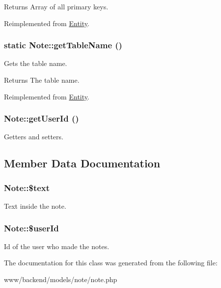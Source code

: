 \begin{DoxyReturn}{Returns}
Array of all primary keys. 
\end{DoxyReturn}


Reimplemented from \hyperlink{classEntity_a61bbfbb4058427174e002a09ddc77c41}{Entity}.

\hypertarget{classNote_a83deedb316c670baa4b31c8d512e6af6}{
\subsubsection[{getTableName}]{\setlength{\rightskip}{0pt plus 5cm}static Note::getTableName ()}}
\label{classNote_a83deedb316c670baa4b31c8d512e6af6}
Gets the table name.

\begin{DoxyReturn}{Returns}
The table name. 
\end{DoxyReturn}


Reimplemented from \hyperlink{classEntity_a8305fd94740ac62cbafb9de76567ce37}{Entity}.

\hypertarget{classNote_ad2e8b55360b22ba5ac67819cc2661804}{
\subsubsection[{getUserId}]{\setlength{\rightskip}{0pt plus 5cm}Note::getUserId ()}}
\label{classNote_ad2e8b55360b22ba5ac67819cc2661804}
Getters and setters. 

\subsection{Member Data Documentation}
\hypertarget{classNote_ae670c2f241d1653966e68b2f3b8ecbaf}{
\subsubsection[{\$text}]{\setlength{\rightskip}{0pt plus 5cm}Note::\$text}}
\label{classNote_ae670c2f241d1653966e68b2f3b8ecbaf}
Text inside the note. \hypertarget{classNote_a98ea63ab026014b1d8d2f1531a2a481e}{
\subsubsection[{\$userId}]{\setlength{\rightskip}{0pt plus 5cm}Note::\$userId}}
\label{classNote_a98ea63ab026014b1d8d2f1531a2a481e}
Id of the user who made the notes. 

The documentation for this class was generated from the following file:\begin{DoxyCompactItemize}
\item 
www/backend/models/note/note.php\end{DoxyCompactItemize}
